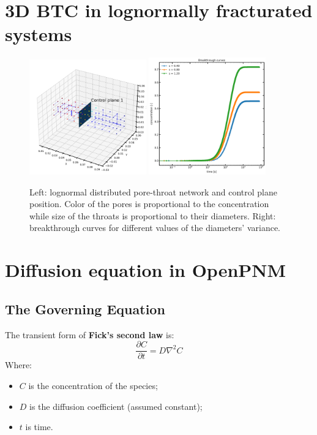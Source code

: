\documentclass{article}
\begin{document}
\FloatBarrier  %
\section{3D BTC in lognormally fracturated systems}
\begin{figure}[htbp!]
    \centering
    \includegraphics[width=0.45\textwidth]{images/fromOpenPNM/logNorm3Ddiam.png}
    \hspace{0.05\textwidth}
    \includegraphics[width=0.45\textwidth]{images/fromOpenPNM/logNorm3Dbtc.png}
    \caption{Left: lognormal distributed pore-throat network and control plane position. Color of the pores is proportional to the concentration while size of the throats is proportional to their diameters. Right: breakthrough curves for different values of the diameters' variance.}
    \label{fig:3DlognormalDiam}
\end{figure}

\FloatBarrier  %
\section{Diffusion equation in OpenPNM}

\subsection{The Governing Equation}
The transient form of \textbf{Fick's second law} is:
\begin{equation}
    \frac{\partial C}{\partial t} = D \nabla^2 C
\end{equation}
Where:
\begin{itemize}
    \item $C$ is the concentration of the species;
    \item $D$ is the diffusion coefficient (assumed constant);
    \item $t$ is time.
\end{itemize}
\end{document}
